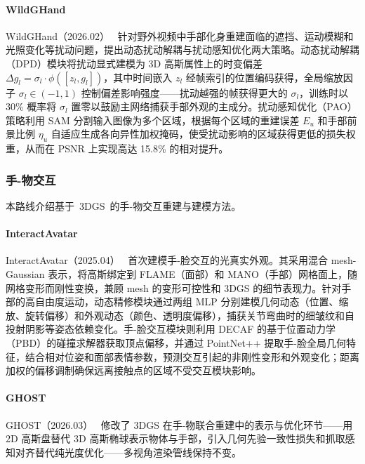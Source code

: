 \paragraph{WildGHand}

WildGHand（2026.02）~\cite{2602_20556} 针对野外视频中手部化身重建面临的遮挡、运动模糊和光照变化等扰动问题，提出动态扰动解耦与扰动感知优化两大策略。动态扰动解耦（DPD）模块将扰动显式建模为 3D 高斯属性上的时变偏差 $\Delta g_l = \sigma_l \cdot \phi([z_l, g_l])$，其中时间嵌入 $z_l$ 经帧索引的位置编码获得，全局缩放因子 $\sigma_l \in (-1, 1)$ 控制偏差影响强度——扰动越强的帧获得更大的 $\sigma_l$，训练时以 30\% 概率将 $\sigma_l$ 置零以鼓励主网络捕获手部外观的主成分。扰动感知优化（PAO）策略利用 SAM 分割输入图像为多个区域，根据每个区域的重建误差 $E_u$ 和手部前景比例 $\eta_u$ 自适应生成各向异性加权掩码，使受扰动影响的区域获得更低的损失权重，从而在 PSNR 上实现高达 15.8\% 的相对提升。

\subsubsection{手-物交互}

本路线介绍基于~3DGS~的手-物交互重建与建模方法。

\paragraph{InteractAvatar}

InteractAvatar（2025.04）~\cite{2504_07949} 首次建模手-脸交互的光真实外观。其采用混合 mesh-Gaussian 表示，将高斯绑定到 FLAME（面部）和 MANO（手部）网格面上，随网格变形而刚性变换，兼顾 mesh 的变形可控性和 3DGS 的细节表现力。针对手部的高自由度运动，动态精修模块通过两组 MLP 分别建模几何动态（位置、缩放、旋转偏移）和外观动态（颜色、透明度偏移），捕获关节弯曲时的细皱纹和自投射阴影等姿态依赖变化。手-脸交互模块则利用 DECAF 的基于位置动力学（PBD）的碰撞求解器获取顶点偏移，并通过 PointNet++ 提取手-脸全局几何特征，结合相对位姿和面部表情参数，预测交互引起的非刚性变形和外观变化；距离加权的偏移调制确保远离接触点的区域不受交互模块影响。

\paragraph{GHOST}

GHOST（2026.03）~\cite{2603_18912} 修改了 3DGS 在手-物联合重建中的表示与优化环节——用 2D 高斯盘替代 3D 高斯椭球表示物体与手部，引入几何先验一致性损失和抓取感知对齐替代纯光度优化——多视角渲染管线保持不变。

